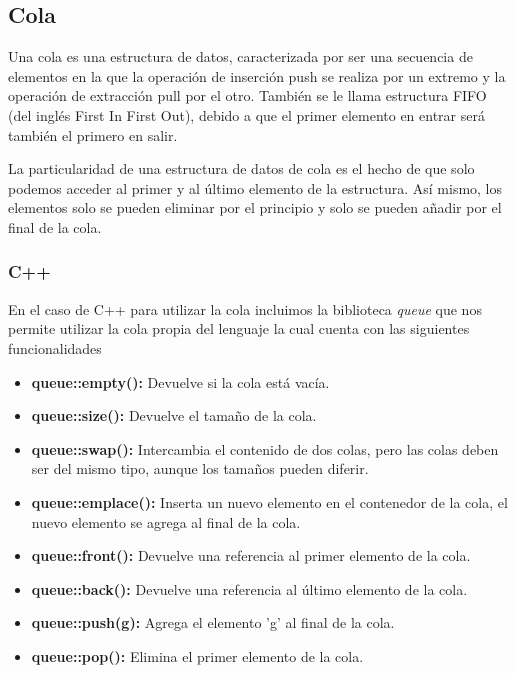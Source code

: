 \subsection{Cola}

Una cola  es una estructura de datos, caracterizada por ser una secuencia de elementos en la que la operación de inserción push se realiza por un extremo y la operación de extracción pull por el otro. También se le llama estructura FIFO (del inglés First In First Out), debido a que el primer elemento en entrar será también el primero en salir.

La particularidad de una estructura de datos de cola es el hecho de que solo podemos acceder al primer y al último elemento de la estructura. Así mismo, los elementos solo se pueden eliminar por el principio y solo se pueden añadir por el final de la cola.

\subsubsection{C++}

En el caso de C++ para utilizar la cola incluimos la biblioteca \emph{queue} que nos permite utilizar la cola propia del lenguaje la cual cuenta con las siguientes funcionalidades

\begin{itemize}
	\item \textbf{queue::empty():} Devuelve si la cola está vacía.
	\item \textbf{queue::size():} Devuelve el tamaño de la cola.
	\item \textbf{queue::swap():} Intercambia el contenido de dos colas, pero las colas deben ser del mismo tipo, aunque los tamaños pueden diferir.
	\item \textbf{queue::emplace():} Inserta un nuevo elemento en el contenedor de la cola, el nuevo elemento se agrega al final de la cola.
	\item \textbf{queue::front():} Devuelve una referencia al primer elemento de la cola.
	\item \textbf{queue::back():} Devuelve una referencia al último elemento de la cola.
	\item \textbf{queue::push(g):} Agrega el elemento 'g' al final de la cola.
	\item \textbf{queue::pop():} Elimina el primer elemento de la cola.
\end{itemize}

